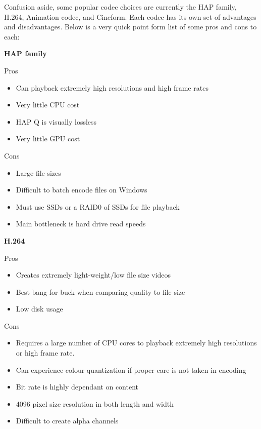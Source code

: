 \begin{fullwidth}
Confusion aside, some popular codec choices are currently the HAP family, H.264, Animation codec, and Cineform. Each codec has its own set of advantages and disadvantages. Below is a very quick point form list of some pros and cons to each:

\vspace{3mm}

\noindent \textbf{HAP family}

\vspace{3mm}

Pros
\begin{itemize}
\item Can playback extremely high resolutions and high frame rates
\item Very little CPU cost
\item HAP Q is visually lossless
\item Very little GPU cost
\end{itemize}

\vspace{3mm}

Cons
\begin{itemize}
\item Large file sizes
\item Difficult to batch encode files on Windows
\item Must use SSDs or a RAID0 of SSDs for file playback
\item Main bottleneck is hard drive read speeds
\end{itemize}

\vspace{6mm}

\noindent \textbf{H.264}

\vspace{3mm}

Pros
\begin{itemize}
\item Creates extremely light-weight/low file size videos
\item Best bang for buck when comparing quality to file size
\item Low disk usage
\end{itemize}

\vspace{3mm}

Cons
\begin{itemize}
\item Requires a large number of CPU cores to playback extremely high resolutions or high frame rate.
\item Can experience colour quantization if proper care is not taken in encoding
\item Bit rate is highly dependant on content
\item 4096 pixel size resolution in both length and width
\item Difficult to create alpha channels
\end{itemize}


\end{fullwidth}
